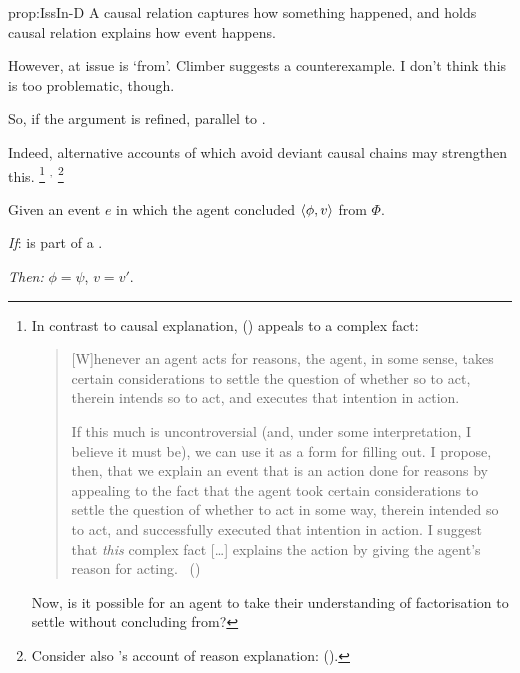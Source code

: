 \begin{note}
\begin{argument}{prop:IssIn-D}
    A causal relation captures how something happened, and \citeauthor{Davidson:1963aa} holds causal relation explains how event happens.

    However, at issue is `from'.
    Climber suggests a counterexample.
    I don't think this is too problematic, though.
  \end{argument}

  So, if the argument is refined, parallel to \issueInclusion{}.

  Indeed, alternative accounts of  which avoid deviant causal chains may strengthen this.%
  \footnote{
    In contrast to causal explanation, \citeauthor{Hieronymi:2011aa} (\citeyear{Hieronymi:2011aa}) appeals to a complex fact:%
    \begin{quote}
      [W]henever an agent acts for reasons, the agent, in some sense, takes certain considerations to settle the question of whether so to act, therein intends so to act, and executes that intention in action.

      If this much is uncontroversial (and, under some interpretation, I believe it must be), we can use it as a form for filling out.
      I propose, then, that we explain an event that is an action done for reasons by appealing to the fact that the agent took certain considerations to settle the question of whether to act in some way, therein intended so to act, and successfully executed that intention in action.
      I suggest that \emph{this} complex fact [\dots] explains the action by giving the agent's reason for acting.%
      \mbox{ }\hfill\mbox{(\citeyear[421]{Hieronymi:2011aa})}
    \end{quote}
    Now, is it possible for an agent to take their understanding of factorisation to settle without concluding from?
  }%
  \(^{,}\)%
  \footnote{
      Consider also \citeauthor{Harman:1973ww}'s account of reason explanation:
       (\citeyear[52]{Harman:1973ww}).
    }

  \begin{proposition}
    Given an event \(e\) in which the agent concluded \(\langle\phi, v\rangle\) from \(\Phi\).

    \begin{itenum}
    \item[\emph{If}:]
       is part of a \rationalisation{}.
    \item[\emph{Then:}]
      \(\phi = \psi\), \(v = v'\).
    \end{itenum}
  \end{proposition}
\end{note}


